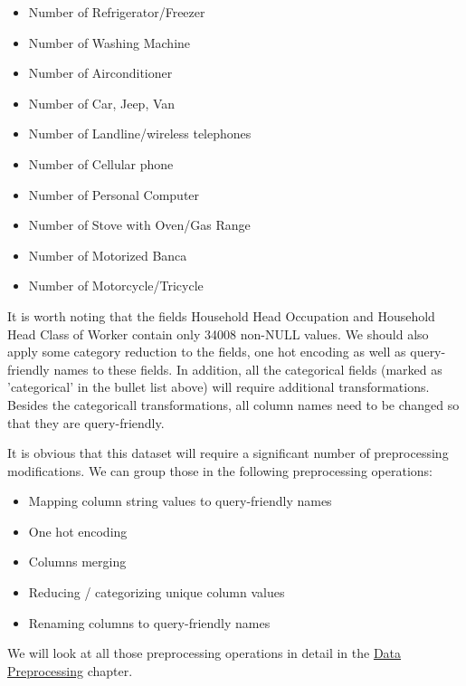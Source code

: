 \documentclass{article}
\begin{document}
\begin{itemize}
\begin{multicols}{2}
\begin{itemize}
        \item Number of Refrigerator/Freezer
        \item Number of Washing Machine
        \item Number of Airconditioner
        \item Number of Car, Jeep, Van
        \item Number of Landline/wireless telephones
        \item Number of Cellular phone
        \item Number of Personal Computer
        \item Number of Stove with Oven/Gas Range
        \item Number of Motorized Banca
        \item Number of Motorcycle/Tricycle
      \end{itemize}
    \end{multicols}
\end{itemize}

It is worth noting that the fields Household Head Occupation and Household Head Class of Worker contain only 34008 non-NULL values. We should also apply some category reduction to the fields, one hot encoding as well as query-friendly names to these fields. In addition, all the categorical fields (marked as 'categorical' in the bullet list above) will require additional transformations. Besides the categoricall transformations, all column names need to be changed so that they are query-friendly.

It is obvious that this dataset will require a significant number of preprocessing modifications. We can group those in the following preprocessing operations:

\begin{itemize}
  \item Mapping column string values to query-friendly names
  \item One hot encoding
  \item Columns merging
  \item Reducing / categorizing unique column values
  \item Renaming columns to query-friendly names
\end{itemize}

We will look at all those preprocessing operations in detail in the \hyperlink{data_prep}{Data Preprocessing} chapter.
\end{document}
